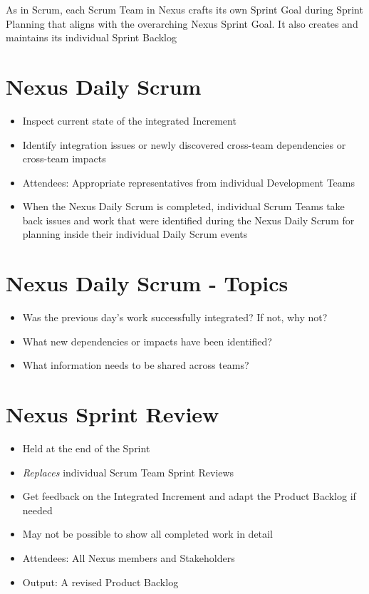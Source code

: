\documentclass[a4paper,11pt,twocolumn]{article}
\begin{document}
\begin{tcolorbox}[colback=black!8!white,colframe=gray!50!black,title=Note,sharp corners,fonttitle=\normalsize\bfseries,fontupper=\normalsize]
	As in Scrum, each Scrum Team in Nexus crafts its own Sprint Goal during Sprint Planning that aligns with the overarching Nexus Sprint Goal. It also creates and maintains its individual Sprint Backlog
\end{tcolorbox}

\section*{Nexus Daily Scrum}
\begin{itemize}
	\item Inspect current state of the integrated Increment
	\item Identify integration issues or newly discovered cross-team dependencies or cross-team impacts
	\item Attendees: Appropriate representatives from individual Development Teams
	\item When the Nexus Daily Scrum is completed, individual Scrum Teams take back issues and work that were identified during the Nexus Daily Scrum for planning inside their individual Daily Scrum events
\end{itemize}

\section*{Nexus Daily Scrum - Topics}
\begin{itemize}
	\item Was the previous day's work successfully integrated? If not, why not?
	\item What new dependencies or impacts have been identified?
	\item What information needs to be shared across teams?
\end{itemize}

\section*{Nexus Sprint Review}
\begin{itemize}
	\item Held at the end of the Sprint
	\item \textit{Replaces} individual Scrum Team Sprint Reviews
	\item Get feedback on the Integrated Increment and adapt the Product Backlog if needed
	\item May not be possible to show all completed work in detail
	\item Attendees: All Nexus members and Stakeholders
	\item Output: A revised Product Backlog
\end{itemize}
\end{document}
